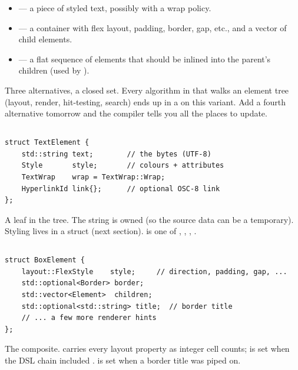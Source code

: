 \begin{itemize}[leftmargin=*]
  \item {} --- a piece of styled text, possibly with
    a wrap policy.
  \item {} --- a container with flex layout, padding,
    border, gap, etc., and a vector of child elements.
  \item {} --- a flat sequence of elements that
    should be inlined into the parent's children (used by ).
\end{itemize}

Three alternatives, a closed set. Every algorithm in \maya{} that
walks an element tree (layout, render, hit-testing, search) ends up
in a  on this variant. Add a fourth alternative
tomorrow and the compiler tells you all the places to update.

\subsection{}

\begin{lstlisting}
struct TextElement {
    std::string text;        // the bytes (UTF-8)
    Style       style;       // colours + attributes
    TextWrap    wrap = TextWrap::Wrap;
    HyperlinkId link{};      // optional OSC-8 link
};
\end{lstlisting}

A leaf in the tree. The string is owned (so the source data can be a
temporary). Styling lives in a  struct (next section).
 is one of , , ,
.

\subsection{}

\begin{lstlisting}
struct BoxElement {
    layout::FlexStyle    style;     // direction, padding, gap, ...
    std::optional<Border> border;
    std::vector<Element>  children;
    std::optional<std::string> title;  // border title
    // ... a few more renderer hints
};
\end{lstlisting}

The composite.  carries every layout property as integer
cell counts;  is set when the DSL chain included
.  is set when a border title was
piped on.

